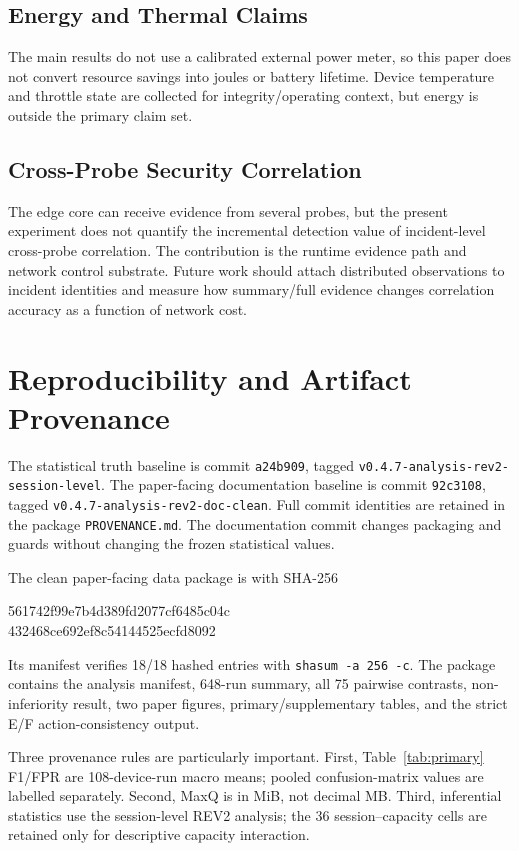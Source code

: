 \documentclass[10pt,journal]{IEEEtran}
\begin{document}
\subsection{Energy and Thermal Claims}
The main results do not use a calibrated external power meter, so this paper does not convert resource savings into joules or battery lifetime. Device temperature and throttle state are collected for integrity/operating context, but energy is outside the primary claim set.

\subsection{Cross-Probe Security Correlation}
The edge core can receive evidence from several probes, but the present experiment does not quantify the incremental detection value of incident-level cross-probe correlation. The contribution is the runtime evidence path and network control substrate. Future work should attach distributed observations to incident identities and measure how summary/full evidence changes correlation accuracy as a function of network cost.

\section{Reproducibility and Artifact Provenance}
The statistical truth baseline is commit \texttt{a24b909}, tagged \texttt{v0.4.7-analysis-rev2-session-level}. The paper-facing documentation baseline is commit \texttt{92c3108}, tagged \texttt{v0.4.7-analysis-rev2-doc-clean}. Full commit identities are retained in the package \texttt{PROVENANCE.md}. The documentation commit changes packaging and guards without changing the frozen statistical values.

The clean paper-facing data package is  with SHA-256
\begin{center}
\scriptsize\ttfamily
561742f99e7b4d389fd2077cf6485c04c\\
432468ce692ef8c54144525ecfd8092
\end{center}
Its manifest verifies 18/18 hashed entries with \texttt{shasum -a 256 -c}. The package contains the analysis manifest, 648-run summary, all 75 pairwise contrasts, non-inferiority result, two paper figures, primary/supplementary tables, and the strict E/F action-consistency output.

Three provenance rules are particularly important. First, Table~\ref{tab:primary} F1/FPR are 108-device-run macro means; pooled confusion-matrix values are labelled separately. Second, MaxQ is in MiB, not decimal MB. Third, inferential statistics use the session-level REV2 analysis; the 36 session--capacity cells are retained only for descriptive capacity interaction.
\end{document}
